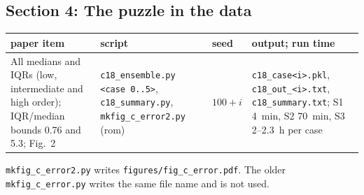 \documentclass[10pt]{article}
\newcommand{\f}[1]{\texttt{#1}}
\begin{document}
\subsection*{Section 4: The puzzle in the data}
\begin{longtable}{L{0.31\textwidth}L{0.25\textwidth}L{0.08\textwidth}L{0.25\textwidth}}
\toprule
paper item & script & seed & output; run time\\ \midrule
All medians and IQRs (low, intermediate and high order); IQR/median bounds 0.76 and 5.3; Fig.~2 & \f{c18\_\allowbreak{}ensemble.py <case 0..5>}, \f{c18\_\allowbreak{}summary.py}, \f{mkfig\_\allowbreak{}c\_\allowbreak{}error2.py} (rom) & $100+i$ & \f{c18\_\allowbreak{}case<i>.pkl}, \f{c18\_\allowbreak{}out\_\allowbreak{}<i>.txt}, \f{c18\_\allowbreak{}summary.txt}; S1 4~min, S2 70~min, S3 2--2.3~h per case\\
\bottomrule
\end{longtable}
\f{mkfig\_\allowbreak{}c\_\allowbreak{}error2.py} writes \f{figures/\allowbreak{}fig\_\allowbreak{}c\_\allowbreak{}error.pdf}. The older \f{mkfig\_\allowbreak{}c\_\allowbreak{}error.py} writes the same file name and is not used.
\end{document}
